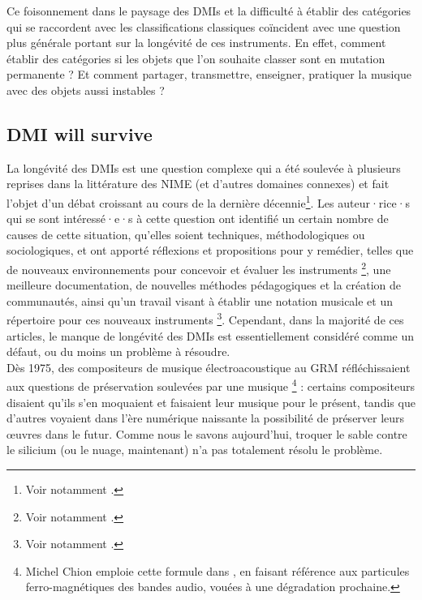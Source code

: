 \noindent Ce foisonnement dans le paysage des \glspl{DMI} et la difficulté à établir des catégories qui se raccordent avec les classifications classiques coïncident avec une question plus générale portant sur la longévité de ces instruments. En effet, comment établir des catégories si les objets que l'on souhaite classer sont en mutation permanente ? Et comment partager, transmettre, enseigner, pratiquer la musique avec des objets aussi instables ?

\subsection{DMI will survive}

\noindent La longévité des \glspl{DMI} est une question complexe qui a été soulevée à plusieurs reprises dans la littérature des \gls{NIME} (et d'autres domaines connexes) et fait l'objet d'un débat croissant au cours de la dernière décennie\footnote{Voir notamment \cite{baguyos_contemporary_2014, morreale_design_2017,bonardi_preservation_2008}.}. Les auteur·rice·s qui se sont intéressé·e·s à cette question ont identifié un certain nombre de causes de cette situation, qu'elles soient techniques, méthodologiques ou sociologiques, et ont apporté réflexions et propositions pour y remédier, telles que de nouveaux environnements pour concevoir et évaluer les instruments \footnote{Voir notamment \cite{jorda_digital_2004, morreale_design_2017}.}, une meilleure documentation, de nouvelles méthodes pédagogiques et la création de communautés, ainsi qu'un travail visant à établir une notation musicale et un répertoire pour ces nouveaux instruments \footnote{Voir notamment \cite{mamedes_composing_2014,mays_notation_2014}.}. Cependant, dans la majorité de ces articles, le manque de longévité des \glspl{DMI} est essentiellement considéré comme un défaut, ou du moins un problème à résoudre.\\
\indent Dès 1975, des compositeurs de musique électroacoustique au \gls{GRM} réfléchissaient aux questions de préservation soulevées par une musique \footnote{Michel Chion emploie cette formule dans \cite{chion_musique_1977}, en faisant référence aux particules ferro-magnétiques des bandes audio, vouées à une dégradation prochaine.} : certains compositeurs disaient qu'ils s'en moquaient et faisaient leur musique pour le présent, tandis que d'autres voyaient dans l'ère numérique naissante la possibilité de préserver leurs œuvres dans le futur. Comme nous le savons aujourd'hui, troquer le sable contre le silicium (ou le nuage, maintenant) n'a pas totalement résolu le problème.\\
